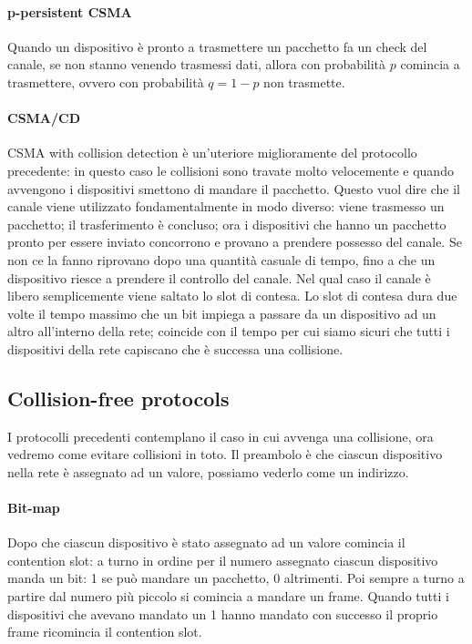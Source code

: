 \documentclass{article}
\begin{document}
\paragraph{p-persistent CSMA}
Quando un dispositivo è pronto a trasmettere un pacchetto fa un check del
canale, se non stanno venendo trasmessi dati, allora con probabilità $p$ comincia
a trasmettere, ovvero con probabilità $q = 1 - p$ non trasmette.

\paragraph{CSMA/CD}
CSMA with collision detection è un'uteriore miglioramente del protocollo
precedente: in questo caso le collisioni sono travate molto velocemente e quando
avvengono i dispositivi smettono di mandare il pacchetto. Questo vuol dire che
il canale viene utilizzato fondamentalmente in modo diverso: viene trasmesso un
pacchetto; il trasferimento è concluso; ora i dispositivi che hanno un pacchetto
pronto per essere inviato concorrono e provano a prendere possesso del canale.
Se non ce la fanno riprovano dopo una quantità casuale di tempo, fino a che un
dispositivo riesce a prendere il controllo del canale. Nel qual caso il canale è
libero semplicemente viene saltato lo slot di contesa. Lo slot di contesa
dura due volte il tempo massimo che un bit impiega a passare da un dispositivo
ad un altro all'interno della rete; coincide con il tempo per cui siamo sicuri
che tutti i dispositivi della rete capiscano che è successa una collisione.

\subsection{Collision-free protocols}
I protocolli precedenti contemplano il caso in cui avvenga una collisione, ora
vedremo come evitare collisioni in toto. Il preambolo è che ciascun dispositivo
nella rete è assegnato ad un valore, possiamo vederlo come un indirizzo.

\paragraph{Bit-map}
Dopo che ciascun dispositivo è stato assegnato ad un valore comincia il
contention slot: a turno in ordine per il numero assegnato ciascun dispositivo
manda un bit: 1 se può mandare un pacchetto, 0 altrimenti. Poi sempre a turno a
partire dal numero più piccolo si comincia a mandare un frame. Quando tutti i
dispositivi che avevano mandato un 1 hanno mandato con successo il proprio frame
ricomincia il contention slot.
\end{document}
